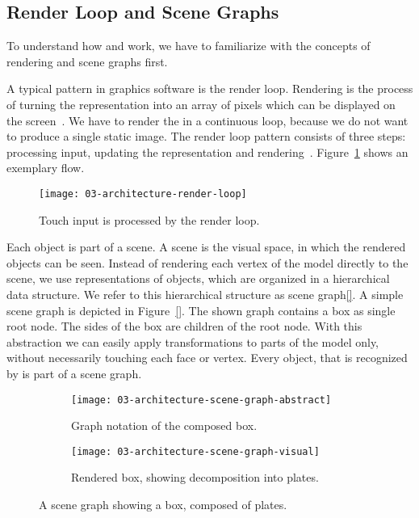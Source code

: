 \documentclass[../ClassicThesis.tex]{subfiles}
\begin{document}
\subsection{Render Loop and Scene Graphs}
\label{sub:render-and-graph}

To understand how {\convertify} and {\platener} work, we have to
familiarize with the concepts of rendering and scene graphs first.

A typical pattern in graphics software is the render loop.
Rendering is the process of turning the {\threedmodel}
representation into an array of pixels which can be
displayed on the screen~\cite[p.~2]{intro-cg}. We have to
render the {\threedmodel} in a continuous loop, because we
do not want to produce a single static image. The render
loop pattern consists of three steps: processing input,
updating the {\threedmodel} representation and
rendering~\cite{gamedev-gameloop}.
Figure~\ref{fig:render-loop} shows an exemplary flow.

\begin{figure}[h]
  \centering
  \texttt{[image: 03-architecture-render-loop]}
  \caption{Touch input is processed by the render loop.}
  \label{fig:render-loop}
\end{figure}

Each object is part of a scene. A scene is the visual space, in which
the rendered objects can be seen. Instead of rendering each vertex of
the model directly to the scene, we use representations of objects,
which are organized in a hierarchical data structure. We refer to this
hierarchical structure as scene graph\ref{}. A simple scene graph is depicted in
Figure~\ref{}. The shown graph contains a box as single root node. The
sides of the box are children of the root node. With this abstraction
we can easily apply transformations to parts of the model only,
without necessarily touching each face or vertex. Every object, that
is recognized by {\convertify} is part of a scene graph.

\begin{figure}[H]
  \centering
  \begin{subfigure}[b]{0.49\textwidth}
    \centering
    \texttt{[image: 03-architecture-scene-graph-abstract]}
    \caption{Graph notation of the composed box.}
    \label{fig:scene-graph:abstract}
  \end{subfigure}
  \begin{subfigure}[b]{0.49\textwidth}
    \centering
    \texttt{[image: 03-architecture-scene-graph-visual]}
    \caption{Rendered box, showing decomposition into plates.}
    \label{fig:scene-graph:visual}
  \end{subfigure}
  \caption{A scene graph showing a box, composed of plates.}
  \label{fig:scene-graph}
\end{figure}
\end{document}
